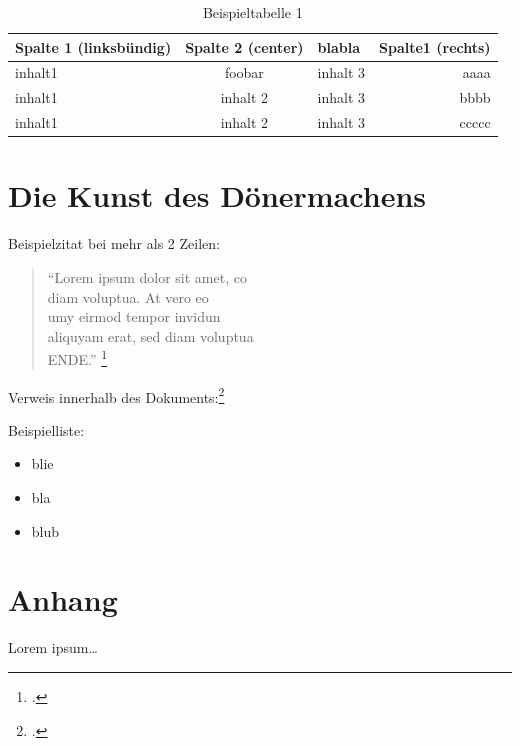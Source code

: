 \begin{table}[h]
\begin{tabularx}{\textwidth}{|l|c|X|r|}
	\hline
	\textbf{Spalte 1} (linksbündig) & \textbf{Spalte 2} (center) &
	blabla & \textbf{Spalte1} (rechts) \\
	\hline
	\hline
	inhalt1 & foobar & inhalt 3 & aaaa \\
	\hline
	inhalt1 & inhalt 2 & inhalt 3 & bbbb \\
	\hline
	inhalt1 & inhalt 2 & inhalt 3 & ccccc \\
	\hline
\end{tabularx}
\caption{Beispieltabelle 1}
\end{table}


\section{Die Kunst des Dönermachens}

Beispielzitat bei mehr als 2 Zeilen:
\begin{quote}
"`Lorem ipsum dolor sit amet, co\\
 diam voluptua. At vero eo \\
umy eirmod tempor invidun \\
aliquyam erat, sed diam voluptua\\
ENDE."' 
\footcite[Wörtlich übernommen von Alice]{praxishandbuch:bpmn2}
\end{quote}
Verweis innerhalb des Dokuments:\footcite[Vgl. \ref{Referenz} auf Seite
\pageref{Referenz} ]{testarticle}


Beispielliste:

\begin{itemize}
\item blie
\item bla
\item blub
\end{itemize}



\begin{figure}[H]
\begin{minipage}{\linewidth}
\begin{center}
\end{center}
\end{minipage}
\end{figure}

\clearpage
\section{Anhang}

Lorem ipsum\ldots
